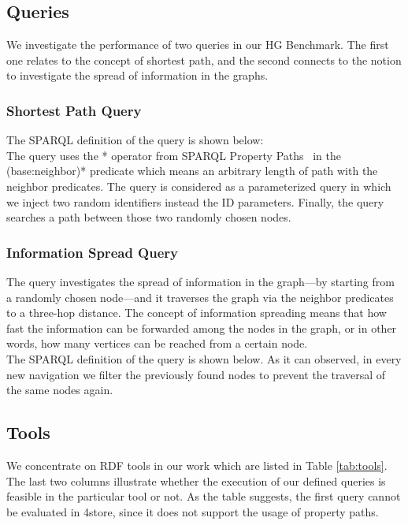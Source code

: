 \subsection{Queries}

We investigate the performance of two queries in our HG Benchmark. The first one relates to the concept of shortest path, and the second connects to the notion to investigate the spread of information in the graphs.

\subsubsection{Shortest Path Query}

The SPARQL definition of the query is shown below:\\


The query uses the \textsf{*} operator from SPARQL Property Paths~\cite{property_path} in the \textsf{(base:neighbor)*} predicate which means an arbitrary length of path with the \textsf{neighbor} predicates. The query is considered as a parameterized query in which we inject two random identifiers instead the \textsf{ID} parameters. Finally, the query searches a path between those two randomly chosen nodes.

\subsubsection{Information Spread Query}
The query investigates the spread of information in the graph---by starting from a randomly chosen node---and it traverses the graph via the \textsf{neighbor} predicates to a three-hop distance. The concept of information spreading means that how fast the information can be forwarded among the nodes in the graph, or in other words, how many vertices can be reached from a certain node.\\
The SPARQL definition of the query is shown below. As it can observed, in every new navigation we filter the previously found nodes to prevent the traversal of the same nodes again.



\subsection{Tools}

We concentrate on RDF tools in our work which are listed in Table \ref{tab:tools}. The last two columns illustrate whether the execution of our defined queries is feasible in the particular tool or not. As the table suggests, the first query cannot be evaluated in \textsf{4store}, since it does not support the usage of property paths.


